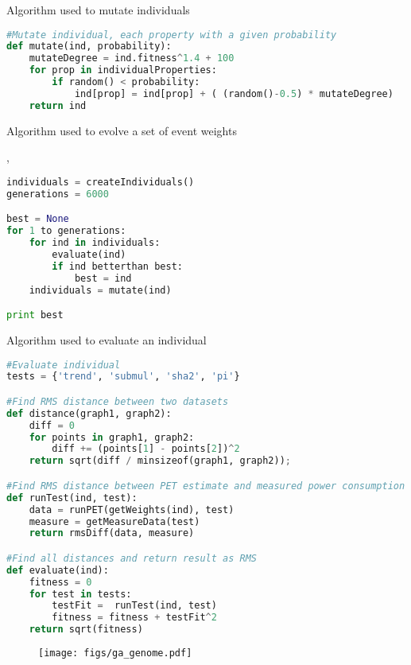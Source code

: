\begin{algorithm}
\caption{Algorithm used to mutate individuals}
\label{lst:ga-mutate-algorithm}
\begin{lstlisting}[language=python,style=algo]
#Mutate individual, each property with a given probability
def mutate(ind, probability):
    mutateDegree = ind.fitness^1.4 + 100
    for prop in individualProperties:
        if random() < probability:
            ind[prop] = ind[prop] + ( (random()-0.5) * mutateDegree)
    return ind
\end{lstlisting}
\end{algorithm}

\begin{algorithm}
\caption{Algorithm used to evolve a set of event weights}
\label{lst:ga-algorithm},
\begin{lstlisting}[language=python,style=algo]
individuals = createIndividuals()
generations = 6000

best = None
for 1 to generations:
    for ind in individuals:
        evaluate(ind)
        if ind betterthan best:
            best = ind
    individuals = mutate(ind)

print best
\end{lstlisting}
\end{algorithm}

\begin{algorithm}
\caption{Algorithm used to evaluate an individual}
\label{lst:ga-eval-algorithm}
\begin{lstlisting}[language=python,style=algo]
#Evaluate individual
tests = {'trend', 'submul', 'sha2', 'pi'}

#Find RMS distance between two datasets
def distance(graph1, graph2):
    diff = 0
    for points in graph1, graph2:
        diff += (points[1] - points[2])^2
    return sqrt(diff / minsizeof(graph1, graph2));

#Find RMS distance between PET estimate and measured power consumption
def runTest(ind, test):
    data = runPET(getWeights(ind), test)
    measure = getMeasureData(test)
    return rmsDiff(data, measure)

#Find all distances and return result as RMS
def evaluate(ind):
    fitness = 0
    for test in tests:
        testFit =  runTest(ind, test)
        fitness = fitness + testFit^2
    return sqrt(fitness)
\end{lstlisting}
\end{algorithm}

\begin{figure}
    \centering
    \def\svgwidth{\columnwidth}
    \texttt{[image: figs/ga\_genome.pdf]}
\end{figure}

